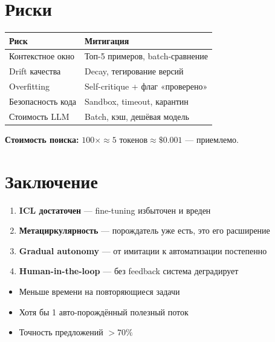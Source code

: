 \documentclass[10pt, oneside]{article}
\begin{document}
\section{Риски}

\begin{tabular}{@{}p{18mm}p{40mm}@{}}
  \toprule
  \textbf{Риск} & \textbf{Митигация} \\
  \midrule
  Контекстное окно
    & Топ-5 примеров, batch-сравнение \\[3pt]
  Drift качества
    & Decay, тегирование версий \\[3pt]
  Overfitting
    & Self-critique + флаг «проверено» \\[3pt]
  Безопасность кода
    & Sandbox, timeout, карантин \\[3pt]
  Стоимость LLM
    & Batch, кэш, дешёвая модель \\
  \bottomrule
\end{tabular}

\vspace{4pt}
\textbf{Стоимость поиска:}
$100 \times \approx5\text{ токенов} \approx \$0.001$ --- приемлемо.

\section{Заключение}

\begin{enumerate}
  \item \textbf{ICL достаточен} --- fine-tuning избыточен и вреден
  \item \textbf{Метациркулярность} --- порождатель уже есть, это его расширение
  \item \textbf{Gradual autonomy} --- от имитации к автоматизации постепенно
  \item \textbf{Human-in-the-loop} --- без feedback система деградирует
\end{enumerate}

\begin{successbox}[title={Через месяц система успешна, если:}]
\begin{itemize}
  \item Меньше времени на повторяющиеся задачи
  \item Хотя бы 1 авто-порождённый полезный поток
  \item Точность предложений $> 70\%$
\end{itemize}
\end{successbox}
\end{document}
